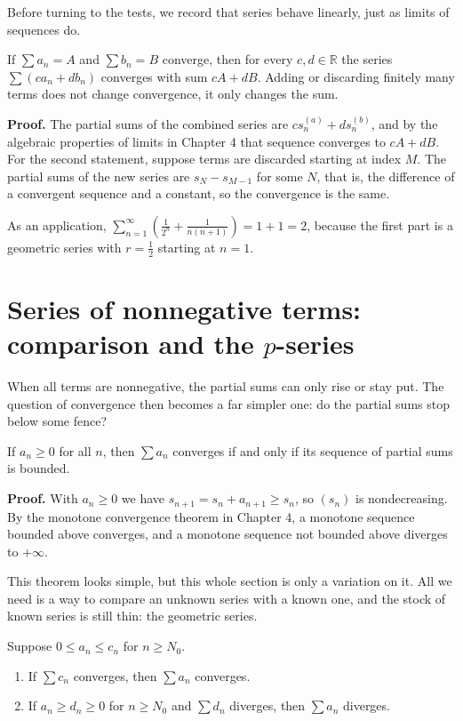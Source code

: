Before turning to the tests, we record that series behave linearly, just as limits of
sequences do.

\begin{proposisi}
If $\sum a_n = A$ and $\sum b_n = B$ converge, then for every $c, d \in \mathbb{R}$ the
series $\sum (c a_n + d b_n)$ converges with sum $cA + dB$. Adding or discarding finitely
many terms does not change convergence, it only changes the sum.
\end{proposisi}

\noindent\textbf{Proof.} The partial sums of the combined series are
$c s_n^{(a)} + d s_n^{(b)}$, and by the algebraic properties of limits in Chapter 4 that
sequence converges to $cA + dB$. For the second statement, suppose terms are discarded
starting at index $M$. The partial sums of the new series are $s_{N} - s_{M-1}$ for some
$N$, that is, the difference of a convergent sequence and a constant, so the convergence is
the same.

As an application, $\sum_{n=1}^{\infty} \left(\frac{1}{2^n} + \frac{1}{n(n+1)}\right) = 1
+ 1 = 2$, because the first part is a geometric series with $r=\tfrac{1}{2}$ starting at
$n=1$.

\section{Series of nonnegative terms: comparison and the $p$-series}

When all terms are nonnegative, the partial sums can only rise or stay put. The question
of convergence then becomes a far simpler one: do the partial sums stop below some fence?

\begin{teorema}
If $a_n \ge 0$ for all $n$, then $\sum a_n$ converges if and only if its sequence of
partial sums is bounded.
\end{teorema}

\noindent\textbf{Proof.} With $a_n \ge 0$ we have $s_{n+1} = s_n + a_{n+1} \ge s_n$, so
$(s_n)$ is nondecreasing. By the monotone convergence theorem in Chapter 4, a monotone
sequence bounded above converges, and a monotone sequence not bounded above diverges to
$+\infty$.

This theorem looks simple, but this whole section is only a variation on it. All we need is
a way to compare an unknown series with a known one, and the stock of known series is still
thin: the geometric series.

\begin{teorema}
Suppose $0 \le a_n \le c_n$ for $n \ge N_0$.
\begin{enumerate}
\item If $\sum c_n$ converges, then $\sum a_n$ converges.
\item If $a_n \ge d_n \ge 0$ for $n \ge N_0$ and $\sum d_n$ diverges, then $\sum a_n$
      diverges.
\end{enumerate}
\end{teorema}

